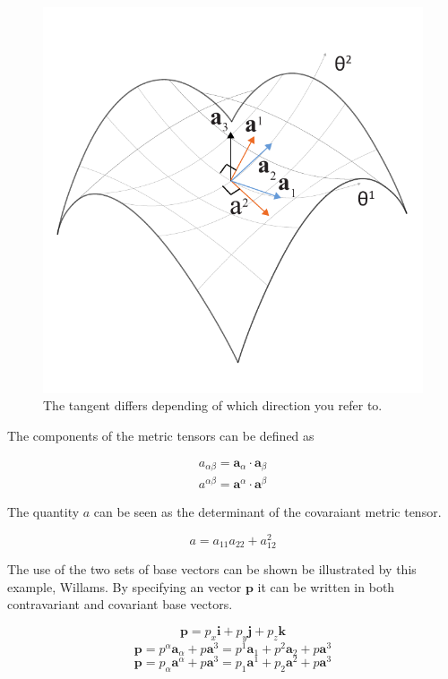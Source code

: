 \begin{figure}[H]
\centering
\includegraphics[width=0.7\linewidth ]{figure/Theory/surfGeometry2.pdf}
\caption{The tangent differs depending of which direction you refer to. }
\end{figure}
 
The components of the metric tensors can be defined as

\begin{align} \label{metricComp}
a_{\alpha \beta} = \textbf{a}_\alpha \cdot \textbf{a}_\beta \\
a^{\alpha \beta} = \textbf{a}^\alpha \cdot \textbf{a}^\beta 
\end{align}

The quantity $a$ can be seen as the determinant of the covaraiant metric tensor.

\begin{equation}
a = a_{11} a_{22} + a_{12}^2
\end{equation}



The use of the two sets of base vectors can be shown be illustrated by this example, Willams. By specifying an vector $\textbf{p}$ it can be written in both contravariant and covariant base vectors.

\begin{equation}
    \textbf{p} = p_x \textbf{i} +p_y \textbf{j} +p_z \textbf{k}  
\end{equation}
\begin{equation}
    \textbf{p} = p^\alpha \textbf{a}_\alpha + p \textbf{a}^3 =   p^1 \textbf{a}_1 +  p^2 \textbf{a}_2 + p \textbf{a}^3 
\end{equation}
\begin{equation}
    \textbf{p} = p_\alpha \textbf{a}^\alpha + p \textbf{a}^3=  p_1 \textbf{a}^1 +  p_2 \textbf{a}^2 + p \textbf{a}^3   
\end{equation}


